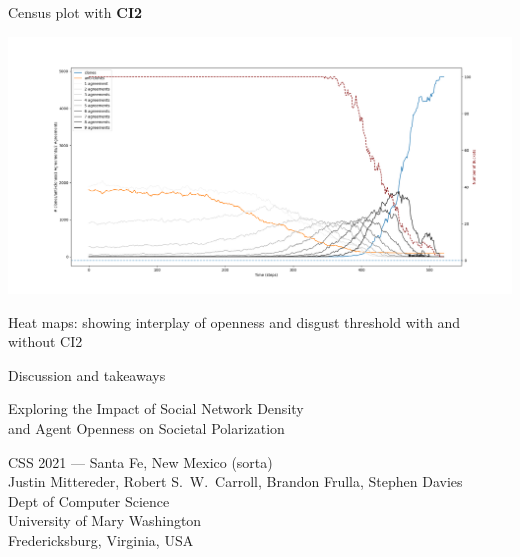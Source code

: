 \documentclass[12pt]{beamer}
\begin{document}
\begin{frame}[c]{Census plot with \textbf{CI2}} %

\vspace{-.3in}
\begin{center}
\hspace{-.6in} \includegraphics[width=1.11\textwidth]{census10issuesCI2.png}
\end{center}

\end{frame}

\begin{frame}[c]{Heat maps: showing interplay of openness and disgust threshold
with and without CI2} %

\end{frame}


%
%
%
%

\begin{frame}[c]{Discussion and takeaways}  %

\end{frame}

\begin{frame}[c]{}

\begin{center}
\Large
Exploring the Impact of Social Network Density\\and Agent Openness on Societal Polarization

\footnotesize
\vspace{.3in}
CSS 2021 --- Santa Fe, New Mexico (sorta)\\
\vspace{.1in}
Justin Mittereder, Robert S.~W.~Carroll, Brandon Frulla, Stephen Davies\\
\smallskip
\scriptsize
Dept of Computer Science\\
University of Mary Washington\\
Fredericksburg, Virginia, USA\\
\end{center}

\end{frame}
\end{document}
